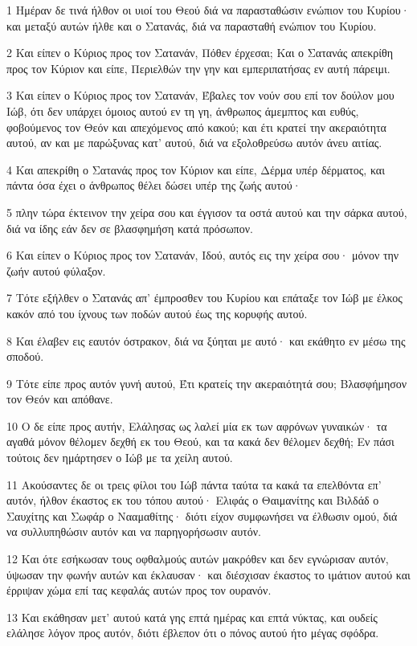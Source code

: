\par 1 Ημέραν δε τινά ήλθον οι υιοί του Θεού διά να παρασταθώσιν ενώπιον του Κυρίου· και μεταξύ αυτών ήλθε και ο Σατανάς, διά να παρασταθή ενώπιον του Κυρίου.
\par 2 Και είπεν ο Κύριος προς τον Σατανάν, Πόθεν έρχεσαι; Και ο Σατανάς απεκρίθη προς τον Κύριον και είπε, Περιελθών την γην και εμπεριπατήσας εν αυτή πάρειμι.
\par 3 Και είπεν ο Κύριος προς τον Σατανάν, Έβαλες τον νούν σου επί τον δούλον μου Ιώβ, ότι δεν υπάρχει όμοιος αυτού εν τη γη, άνθρωπος άμεμπτος και ευθύς, φοβούμενος τον Θεόν και απεχόμενος από κακού; και έτι κρατεί την ακεραιότητα αυτού, αν και με παρώξυνας κατ' αυτού, διά να εξολοθρεύσω αυτόν άνευ αιτίας.
\par 4 Και απεκρίθη ο Σατανάς προς τον Κύριον και είπε, Δέρμα υπέρ δέρματος, και πάντα όσα έχει ο άνθρωπος θέλει δώσει υπέρ της ζωής αυτού·
\par 5 πλην τώρα έκτεινον την χείρα σου και έγγισον τα οστά αυτού και την σάρκα αυτού, διά να ίδης εάν δεν σε βλασφημήση κατά πρόσωπον.
\par 6 Και είπεν ο Κύριος προς τον Σατανάν, Ιδού, αυτός εις την χείρα σου· μόνον την ζωήν αυτού φύλαξον.
\par 7 Τότε εξήλθεν ο Σατανάς απ' έμπροσθεν του Κυρίου και επάταξε τον Ιώβ με έλκος κακόν από του ίχνους των ποδών αυτού έως της κορυφής αυτού.
\par 8 Και έλαβεν εις εαυτόν όστρακον, διά να ξύηται με αυτό· και εκάθητο εν μέσω της σποδού.
\par 9 Τότε είπε προς αυτόν γυνή αυτού, Έτι κρατείς την ακεραιότητά σου; Βλασφήμησον τον Θεόν και απόθανε.
\par 10 Ο δε είπε προς αυτήν, Ελάλησας ως λαλεί μία εκ των αφρόνων γυναικών· τα αγαθά μόνον θέλομεν δεχθή εκ του Θεού, και τα κακά δεν θέλομεν δεχθή; Εν πάσι τούτοις δεν ημάρτησεν ο Ιώβ με τα χείλη αυτού.
\par 11 Ακούσαντες δε οι τρεις φίλοι του Ιώβ πάντα ταύτα τα κακά τα επελθόντα επ' αυτόν, ήλθον έκαστος εκ του τόπου αυτού· Ελιφάς ο Θαιμανίτης και Βιλδάδ ο Σαυχίτης και Σωφάρ ο Νααμαθίτης· διότι είχον συμφωνήσει να έλθωσιν ομού, διά να συλλυπηθώσιν αυτόν και να παρηγορήσωσιν αυτόν.
\par 12 Και ότε εσήκωσαν τους οφθαλμούς αυτών μακρόθεν και δεν εγνώρισαν αυτόν, ύψωσαν την φωνήν αυτών και έκλαυσαν· και διέσχισαν έκαστος το ιμάτιον αυτού και έρριψαν χώμα επί τας κεφαλάς αυτών προς τον ουρανόν.
\par 13 Και εκάθησαν μετ' αυτού κατά γης επτά ημέρας και επτά νύκτας, και ουδείς ελάλησε λόγον προς αυτόν, διότι έβλεπον ότι ο πόνος αυτού ήτο μέγας σφόδρα.

